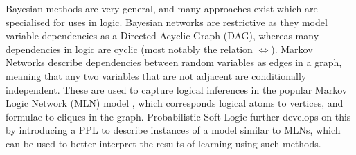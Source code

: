 Bayesian methods are very general, and many approaches exist which are specialised for uses in logic. Bayesian networks are restrictive as they model variable dependencies as a Directed Acyclic Graph (DAG), whereas many dependencies in logic are cyclic (most notably the relation $\iff$). Markov Networks describe dependencies between random variables as edges in a graph, meaning that any two variables that are not adjacent are conditionally independent. These are used to capture logical inferences in the popular Markov Logic Network (MLN) model \cite{markovlogicnetworks}, which corresponds logical atoms to vertices, and formulae to cliques in the graph. Probabilistic Soft Logic \cite{probsoftlogic} further develops on this by introducing a PPL to describe instances of a model similar to MLNs, which can be used to better interpret the results of learning using such methods.



